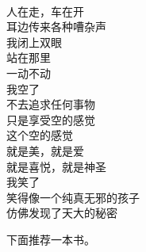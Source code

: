 \begin{poem}[笑]
    \begin{multicols}{4}
        \centering~\\
        人在走，车在开 \\ 耳边传来各种嘈杂声 \\ 我闭上双眼 \\ 站在那里 \\ 一动不动 \\ 我空了 \\ 不去追求任何事物 \\ 只是享受空的感觉 \\ 这个空的感觉 \\ 就是美，就是爱 \\ 就是喜悦，就是神圣 \\ 我笑了 \\ 笑得像一个纯真无邪的孩子 \\ 仿佛发现了天大的秘密
    \end{multicols}
\end{poem}

下面推荐一本书。

